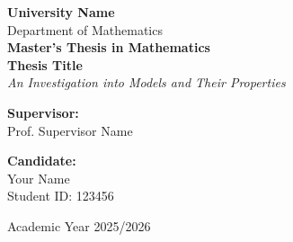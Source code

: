 \documentclass[12pt, a4paper, oneside]{book}
\begin{document}
\begin{titlepage}
    \centering
    {\Large \textbf{University Name}}\\[0.5cm]
    {\large Department of Mathematics}\\[2cm]

    {\Large \textbf{Master's Thesis in Mathematics}}\\[3cm]

    {\Huge \textbf{Thesis Title}}\\[2cm]
    {\Large \textit{An Investigation into Models and Their Properties}}\\[3cm]

    \begin{flushleft}
        \textbf{Supervisor:} \\ Prof. Supervisor Name
    \end{flushleft}
    \vfill
    \begin{flushright}
        \textbf{Candidate:} \\ Your Name \\ Student ID: 123456
    \end{flushright}

    \vfill
    {\large Academic Year 2025/2026}
\end{titlepage}


\frontmatter %
\tableofcontents

\mainmatter %




\backmatter
\printbibliography[heading=bibintoc, title={Bibliografia}]
\end{document}
